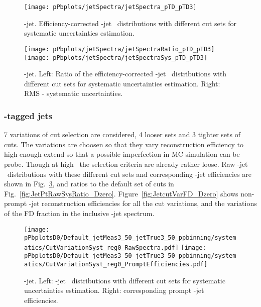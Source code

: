 \begin{figure}[bth]
\begin{center}
\texttt{[image: pPbplots/jetSpectra/jetSpectra\_pTD\_pTD3]}
\caption{\Dstar-jet. Efficiency-corrected \Dstar-jet \pt\ distributions with different cut sets for systematic uncertainties estimation.} 
\label{fig:JetPtSys}
\end{center}
\end{figure}

\begin{figure}[bth]
\begin{center}
\texttt{[image: pPbplots/jetSpectra/jetSpectraRatio\_pTD\_pTD3]}
\texttt{[image: pPbplots/jetSpectra/jetSpectraSys\_pTD\_pTD3]}
\caption{\Dstar-jet. Left: Ratio of the efficiency-corrected \Dstar-jet \pt\ distributions with different cut sets for systematic uncertainties estimation. Right: RMS - systematic uncertainties.} 
\label{fig:JetPtSys}
\end{center}
\end{figure}

\subsubsection{\Dzero-tagged jets}

7 variations of cut selection are considered, 4 looser sets and 3 tighter sets of cuts. The variations are choosen so that they vary \Dzero reconstruction efficiency to high enough extend so that a possible imperfection in MC simulation can be probe. Though at high \ptd\ the selection criteria are already rather loose.
Raw \Dzero-jet \pt\ distributions with these different cut sets and corresponding \Dzero-jet efficiencies are shown in Fig.~\ref{fig:JetPtRawSys_Dzero}, and ratios to the default set of cuts in Fig.~\ref{fig:JetPtRawSysRatio_Dzero}.
Figure~\ref{fig:JetcutVarFD_Dzero} shows non-prompt \Dzero-jet reconstruction efficiencies for all the cut variations, and the variations of the FD fraction in the inclusive \Dzero-jet spectrum.

\begin{figure}[bth]
\begin{center}
\texttt{[image: pPbplotsD0/Default\_jetMeas3\_50\_jetTrue3\_50\_ppbinning/systematics/CutVariationSyst\_reg0\_RawSpectra.pdf]}
\texttt{[image: pPbplotsD0/Default\_jetMeas3\_50\_jetTrue3\_50\_ppbinning/systematics/CutVariationSyst\_reg0\_PromptEfficiencies.pdf]}
\caption{\Dzero-jet. Left: \Dzero-jet \pt\ distributions with different cut sets for systematic uncertainties estimation. Right: corresponding prompt \Dzero-jet efficiencies.} 
\label{fig:JetPtRawSys_Dzero}
\end{center}
\end{figure}

